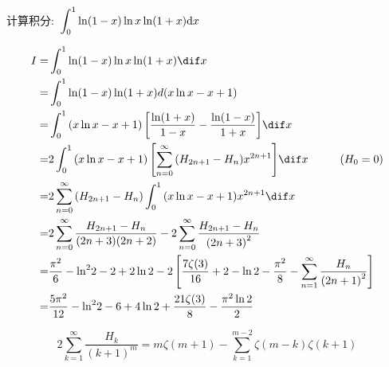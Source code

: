 \documentclass[color=green,titlestyle=hang]{elegantbook}%
\begin{document}
\begin{example}
计算积分:~$\displaystyle\int_{\rm{0}}^{\rm{1}} \ln (1 - x)\ln x\ln (1 + x) \textrm{d}x$
\end{example}\begin{Solution}
\begin{align*}
I=&\int_{\rm{0}}^{\rm{1}} {\ln (1 - x)\ln x\ln (1 + x)\dif x} \\
=& \int_{\rm{0}}^{\rm{1}} {\ln (1 - x)\ln (1 + x)d(x\ln x - x + 1)} \\
=& \int_{\rm{0}}^{\rm{1}} {(x\ln x - x + 1)\left[ {\frac{{\ln (1 + x)}}{{1 - x}} - \frac{{\ln (1 - x)}}{{1 + x}}} \right]} \dif x\\
=& 2\int_{\rm{0}}^{\rm{1}} {(x\ln x - x + 1)\left[ {\sum\limits_{n = 0}^\infty  {({H_{2n + 1}} - {H_n}){x^{2n + 1}}} } \right]} \dif x\hspace{10mm}({H_0} = 0)\\
=& 2\sum\limits_{n = 0}^\infty  {({H_{2n + 1}} - {H_n})\int_0^1 {(x\ln x - x + 1){x^{2n + 1}}\dif x} } \\
=& 2\sum\limits_{n = 0}^\infty  {\frac{{{H_{2n + 1}} - {H_n}}}{{(2n + 3)(2n + 2)}}}  - 2\sum\limits_{n = 0}^\infty  {\frac{{{H_{2n + 1}} - {H_n}}}{{{{(2n + 3)}^2}}}} \\
=& \frac{{{\pi ^2}}}{6} - {\ln ^2}2 - 2 + 2\ln 2 - 2\left[ {\frac{{7\zeta (3)}}{{16}} + 2 - \ln 2 - \frac{{{\pi ^2}}}{8} - \sum\limits_{n = 1}^\infty  {\frac{{{H_n}}}{{{{(2n + 1)}^2}}}} } \right]\\
=& \frac{{5{\pi ^2}}}{{12}} - {\ln ^2}2 - 6 + 4\ln 2 + \frac{{21\zeta (3)}}{8} - \frac{{{\pi ^2}\ln 2}}{2}
\end{align*}
\end{Solution}\begin{note}
\[2\sum_{k=1}^{\infty}\frac{H_k}{(k+1)^m}=m\zeta(m+1)-\sum_{k=1}^{m-2}\zeta(m-k)\zeta(k+1)\]
\end{note}
\end{document}
